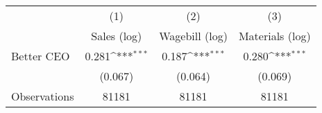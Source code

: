 {
\def\sym#1{\ifmmode^{#1}\else\(^{#1}\)\fi}
\begin{tabular}{l*{3}{c}}
\hline\hline
                    &\multicolumn{1}{c}{(1)}&\multicolumn{1}{c}{(2)}&\multicolumn{1}{c}{(3)}\\
                    &\multicolumn{1}{c}{Sales (log)}&\multicolumn{1}{c}{Wagebill (log)}&\multicolumn{1}{c}{Materials (log)}\\
\hline
Better CEO          &       0.281\sym{***}&       0.187\sym{***}&       0.280\sym{***}\\
                    &     (0.067)         &     (0.064)         &     (0.069)         \\
\hline
Observations        &       81181         &       81181         &       81181         \\
\hline\hline
\end{tabular}
}
